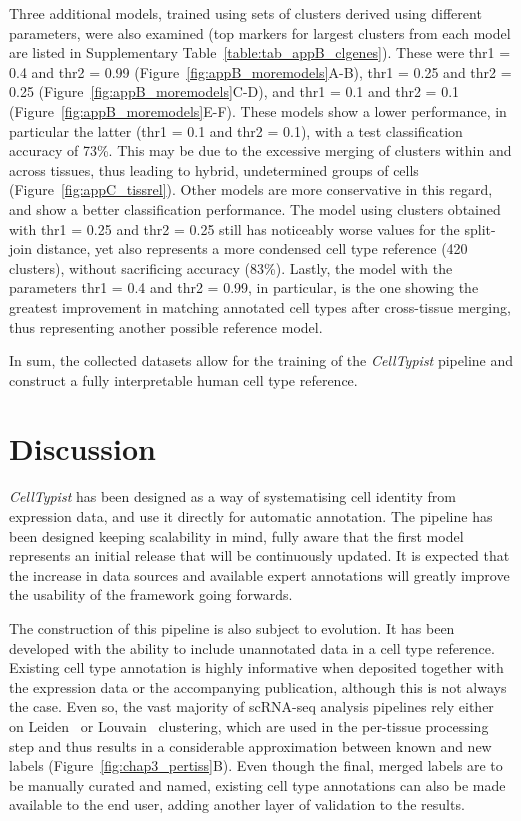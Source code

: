 Three additional models, trained using sets of clusters derived using different parameters, were also examined (top markers for largest clusters from each model are listed in Supplementary Table~\ref{table:tab_appB_clgenes}). These were thr1 = 0.4 and thr2 = 0.99 (Figure~\ref{fig:appB_moremodels}A-B), thr1 = 0.25 and thr2 = 0.25 (Figure~\ref{fig:appB_moremodels}C-D), and thr1 = 0.1 and thr2 = 0.1 (Figure~\ref{fig:appB_moremodels}E-F). These models show a lower performance, in particular the latter (thr1 = 0.1 and thr2 = 0.1), with a test classification accuracy of 73\%. This may be due to the excessive merging of clusters within and across tissues, thus leading to hybrid, undetermined groups of cells (Figure~\ref{fig:appC_tissrel}). Other models are more conservative in this regard, and show a better classification performance. The model using clusters obtained with thr1 = 0.25 and thr2 = 0.25 still has noticeably worse values for the split-join distance, yet also represents a more condensed cell type reference (420 clusters), without sacrificing accuracy (83\%). Lastly, the model with the parameters thr1 = 0.4 and thr2 = 0.99, in particular, is the one showing the greatest improvement in matching annotated cell types after cross-tissue merging, thus representing another possible reference model.

In sum, the collected datasets allow for the training of the \textit{CellTypist} pipeline and construct a fully interpretable human cell type reference.


\section{Discussion}
\label{section3.5}
\textit{CellTypist} has been designed as a way of systematising cell identity from expression data, and use it directly for automatic annotation. The pipeline has been designed keeping scalability in mind, fully aware that the first model represents an initial release that will be continuously updated. It is expected that the increase in data sources and available expert annotations will greatly improve the usability of the framework going forwards.

The construction of this pipeline is also subject to evolution. It has been developed with the ability to include unannotated data in a cell type reference. Existing cell type annotation is highly informative when deposited together with the expression data or the accompanying publication, although this is not always the case. Even so, the vast majority of scRNA-seq analysis pipelines rely either on Leiden~\citep{traag_louvain_2019} or Louvain~\citep{blondel_fast_2008} clustering, which are used in the per-tissue processing step and thus results in a considerable approximation between known and new labels (Figure~\ref{fig:chap3_pertiss}B). Even though the final, merged labels are to be manually curated and named, existing cell type annotations can also be made available to the end user, adding another layer of validation to the results.

